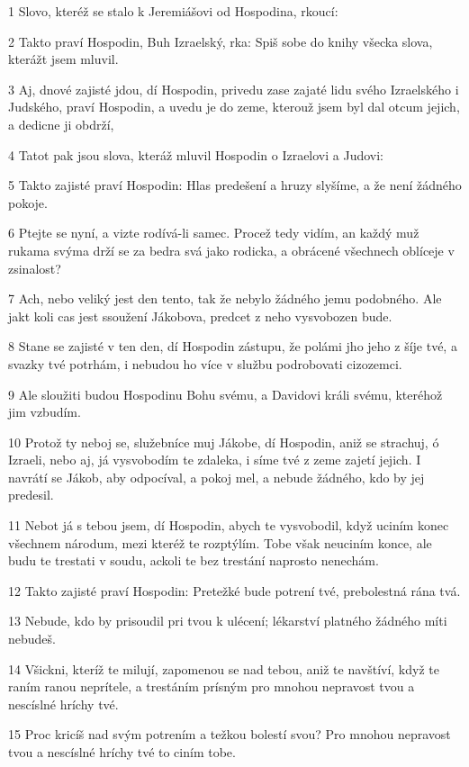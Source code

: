 \par 1 Slovo, kteréž se stalo k Jeremiášovi od Hospodina, rkoucí:
\par 2 Takto praví Hospodin, Buh Izraelský, rka: Spiš sobe do knihy všecka slova, kterážt jsem mluvil.
\par 3 Aj, dnové zajisté jdou, dí Hospodin, privedu zase zajaté lidu svého Izraelského i Judského, praví Hospodin, a uvedu je do zeme, kterouž jsem byl dal otcum jejich, a dedicne ji obdrží,
\par 4 Tatot pak jsou slova, kteráž mluvil Hospodin o Izraelovi a Judovi:
\par 5 Takto zajisté praví Hospodin: Hlas predešení a hruzy slyšíme, a že není žádného pokoje.
\par 6 Ptejte se nyní, a vizte rodívá-li samec. Procež tedy vidím, an každý muž rukama svýma drží se za bedra svá jako rodicka, a obrácené všechnech oblíceje v zsinalost?
\par 7 Ach, nebo veliký jest den tento, tak že nebylo žádného jemu podobného. Ale jakt koli cas jest ssoužení Jákobova, predcet z neho vysvobozen bude.
\par 8 Stane se zajisté v ten den, dí Hospodin zástupu, že polámi jho jeho z šíje tvé, a svazky tvé potrhám, i nebudou ho více v službu podrobovati cizozemci.
\par 9 Ale sloužiti budou Hospodinu Bohu svému, a Davidovi králi svému, kteréhož jim vzbudím.
\par 10 Protož ty neboj se, služebníce muj Jákobe, dí Hospodin, aniž se strachuj, ó Izraeli, nebo aj, já vysvobodím te zdaleka, i síme tvé z zeme zajetí jejich. I navrátí se Jákob, aby odpocíval, a pokoj mel, a nebude žádného, kdo by jej predesil.
\par 11 Nebot já s tebou jsem, dí Hospodin, abych te vysvobodil, když uciním konec všechnem národum, mezi kteréž te rozptýlím. Tobe však neuciním konce, ale budu te trestati v soudu, ackoli te bez trestání naprosto nenechám.
\par 12 Takto zajisté praví Hospodin: Pretežké bude potrení tvé, prebolestná rána tvá.
\par 13 Nebude, kdo by prisoudil pri tvou k ulécení; lékarství platného žádného míti nebudeš.
\par 14 Všickni, kteríž te milují, zapomenou se nad tebou, aniž te navštíví, když te raním ranou neprítele, a trestáním prísným pro mnohou nepravost tvou a nescíslné hríchy tvé.
\par 15 Proc kricíš nad svým potrením a težkou bolestí svou? Pro mnohou nepravost tvou a nescíslné hríchy tvé to ciním tobe.
